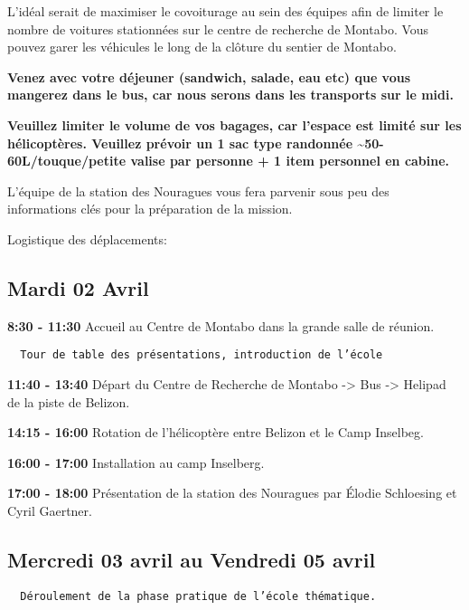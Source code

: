 \documentclass[
]{article}
\begin{document}
L'idéal serait de maximiser le covoiturage au sein des équipes afin de
limiter le nombre de voitures stationnées sur le centre de recherche de
Montabo. Vous pouvez garer les véhicules le long de la clôture du
sentier de Montabo.

\textbf{Venez avec votre déjeuner (sandwich, salade, eau etc) que vous
mangerez dans le bus, car nous serons dans les transports sur le midi.}

\textbf{Veuillez limiter le volume de vos bagages, car l'espace est
limité sur les hélicoptères. Veuillez prévoir un 1 sac type randonnée
\textasciitilde50-60L/touque/petite valise par personne + 1 item
personnel en cabine.}

L'équipe de la station des Nouragues vous fera parvenir sous peu des
informations clés pour la préparation de la mission.

Logistique des déplacements:

\hypertarget{mardi-02-avril}{%
\subsection{Mardi 02 Avril}\label{mardi-02-avril}}

\textbf{8:30 - 11:30} Accueil au Centre de Montabo dans la grande salle
de réunion.

\begin{verbatim}
  Tour de table des présentations, introduction de l’école
\end{verbatim}

\textbf{11:40 - 13:40} Départ du Centre de Recherche de Montabo
-\textgreater{} Bus -\textgreater{} Helipad de la piste de Belizon.

\textbf{14:15 - 16:00} Rotation de l'hélicoptère entre Belizon et le
Camp Inselbeg.

\textbf{16:00 - 17:00} Installation au camp Inselberg.

\textbf{17:00 - 18:00} Présentation de la station des Nouragues par
Élodie Schloesing et Cyril Gaertner.

\hypertarget{mercredi-03-avril-au-vendredi-05-avril}{%
\subsection{Mercredi 03 avril au Vendredi 05
avril}\label{mercredi-03-avril-au-vendredi-05-avril}}

\begin{verbatim}
  Déroulement de la phase pratique de l’école thématique.
\end{verbatim}
\end{document}
